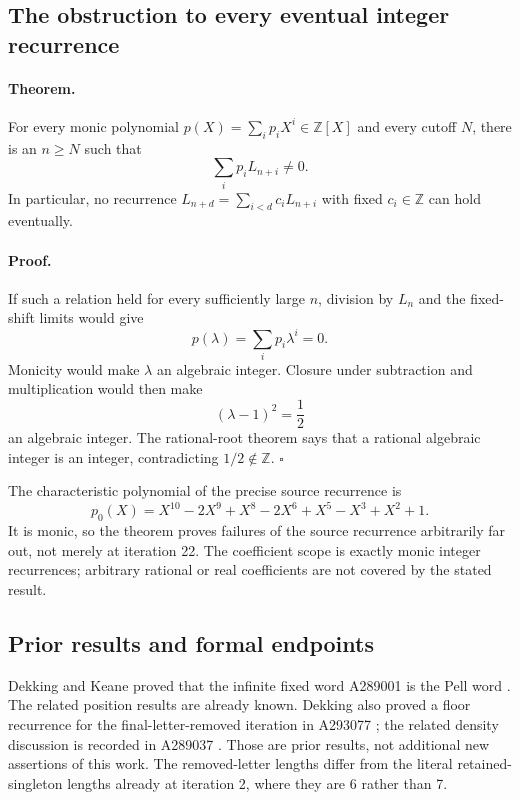 \subsection{The obstruction to every eventual integer recurrence}

\paragraph{Theorem.}
For every monic polynomial $p(X)=\sum_i p_iX^i\in\mathbb Z[X]$
and every cutoff $N$, there is an $n\ge N$ such that
\[
 \sum_i p_iL_{n+i}\ne0.
\]
In particular, no recurrence
$L_{n+d}=\sum_{i<d}c_iL_{n+i}$ with fixed $c_i\in\mathbb Z$
can hold eventually.

\paragraph{Proof.}
If such a relation held for every sufficiently large $n$, division by
$L_n$ and the fixed-shift limits would give
\[
 p(\lambda)=\sum_i p_i\lambda^i=0.
\]
Monicity would make $\lambda$ an algebraic integer. Closure under
subtraction and multiplication would then make
\[
 (\lambda-1)^2=\frac12
\]
an algebraic integer. The rational-root theorem says that a rational
algebraic integer is an integer, contradicting $1/2\notin\mathbb Z$.
\hfill$\square$

The characteristic polynomial of the precise source recurrence is
\[
 p_0(X)=X^{10}-2X^9+X^8-2X^6+X^5-X^3+X^2+1.
\]
It is monic, so the theorem proves failures of the source recurrence
arbitrarily far out, not merely at iteration 22. The coefficient scope
is exactly monic integer recurrences; arbitrary rational or real
coefficients are not covered by the stated result.

\subsection{Prior results and formal endpoints}

Dekking and Keane proved that the infinite fixed word A289001 is the
Pell word \cite[Theorem~4]{DekkingKeane}. The related position results
are already known. Dekking also proved a floor recurrence for the
final-letter-removed iteration in A293077 \cite{A293077}; the related
density discussion is recorded in A289037 \cite{A289037}.
Those are prior results, not additional new assertions of this work.
The removed-letter lengths differ from the literal retained-singleton
lengths already at iteration 2, where they are 6 rather than 7.

